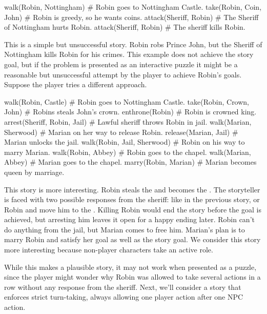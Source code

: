 \documentclass{nilreport}
\begin{document}
\begin{code}
walk(Robin, Nottingham) # Robin goes to Nottingham Castle.
take(Robin, Coin, John) # Robin is greedy, so he wants coins.
attack(Sheriff, Robin)  # The Sheriff of Nottingham hurts Robin.
attack(Sheriff, Robin)  # The sheriff kills Robin.
\end{code}

This is a simple but unsuccessful story. Robin robs Prince John, but the Sheriff of Nottingham kills Robin for his crimes. This example does not achieve the story goal, but if the problem is presented as an interactive puzzle it might be a reasonable but unsuccessful attempt by the player to achieve Robin's goals. Suppose the player tries a different approach.

\begin{code}
walk(Robin, Castle)          # Robin goes to Nottingham Castle.
take(Robin, Crown, John)     # Robins steals John's crown.
enthrone(Robin)              # Robin is crowned king.
arrest(Sheriff, Robin, Jail) # Lawful sheriff throws Robin in jail.
walk(Marian, Sherwood)       # Marian on her way to release Robin.
release(Marian, Jail)        # Marian unlocks the jail.
walk(Robin, Jail, Sherwood)  # Robin on his way to marry Marian.
walk(Robin, Abbey)           # Robin goes to the chapel.
walk(Marian, Abbey)          # Marian goes to the chapel.
marry(Robin, Marian)         # Marian becomes queen by marriage.
\end{code}

This story is more interesting. Robin steals the  and becomes the . The storyteller is faced with two possible responses from the sheriff:  like in the previous story, or  Robin and move him to the . Killing Robin would end the story before the goal is achieved, but arresting him leaves it open for a happy ending later. Robin can't do anything from the jail, but Marian comes to free him. Marian's plan is to marry Robin and satisfy her  goal as well as the story goal. We consider this story more interesting because non-player characters take an active role.

While this makes a plausible story, it may not work when presented as a puzzle, since the player might wonder why Robin was allowed to take several actions in a row without any response from the sheriff. Next, we'll consider a story that enforces strict turn-taking, always allowing one player action after one NPC action.
\end{document}
